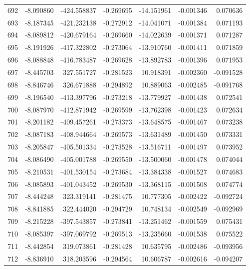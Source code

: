 \begin{tabular}{rrrrrrr}
 692 &  -8.090860 & -424.558837 & -0.269695 &  -14.151961 &   -0.001346 &  0.070636 \\
 693 &  -8.187345 & -421.232138 & -0.272912 &  -14.041071 &   -0.001384 &  0.071193 \\
 694 &  -8.089812 & -420.679164 & -0.269660 &  -14.022639 &   -0.001371 &  0.071287 \\
 695 &  -8.191926 & -417.322802 & -0.273064 &  -13.910760 &   -0.001411 &  0.071859 \\
 696 &  -8.088848 & -416.783487 & -0.269628 &  -13.892783 &   -0.001396 &  0.071953 \\
 697 &  -8.445703 &  327.551727 & -0.281523 &   10.918391 &   -0.002360 & -0.091528 \\
 698 &  -8.846746 &  326.671888 & -0.294892 &   10.889063 &   -0.002485 & -0.091768 \\
 699 &  -8.196540 & -413.397796 & -0.273218 &  -13.779927 &   -0.001438 &  0.072541 \\
 700 &  -8.087970 & -412.871942 & -0.269599 &  -13.762398 &   -0.001423 &  0.072634 \\
 701 &  -8.201182 & -409.457261 & -0.273373 &  -13.648575 &   -0.001467 &  0.073238 \\
 702 &  -8.087183 & -408.944664 & -0.269573 &  -13.631489 &   -0.001450 &  0.073331 \\
 703 &  -8.205847 & -405.501334 & -0.273528 &  -13.516711 &   -0.001497 &  0.073952 \\
 704 &  -8.086490 & -405.001788 & -0.269550 &  -13.500060 &   -0.001478 &  0.074044 \\
 705 &  -8.210531 & -401.530154 & -0.273684 &  -13.384338 &   -0.001527 &  0.074683 \\
 706 &  -8.085893 & -401.043452 & -0.269530 &  -13.368115 &   -0.001508 &  0.074774 \\
 707 &  -8.444248 &  323.319141 & -0.281475 &   10.777305 &   -0.002422 & -0.092724 \\
 708 &  -8.841885 &  322.444020 & -0.294729 &   10.748134 &   -0.002549 & -0.092969 \\
 709 &  -8.215228 & -397.543857 & -0.273841 &  -13.251462 &   -0.001559 &  0.075431 \\
 710 &  -8.085397 & -397.069792 & -0.269513 &  -13.235660 &   -0.001538 &  0.075522 \\
 711 &  -8.442854 &  319.073861 & -0.281428 &   10.635795 &   -0.002486 & -0.093956 \\
 712 &  -8.836910 &  318.203596 & -0.294564 &   10.606787 &   -0.002616 & -0.094207 \\

\end{tabular}
